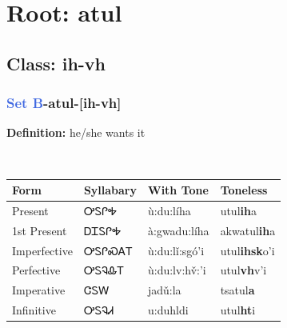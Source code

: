 \needspace{4in}
\section*{Root: atul}
\nopagebreak
{}
\needspace{3in}
\subsection*{Class: ih-vh}
\nopagebreak
\needspace{2in}
\subsubsection*{\textcolor{RoyalBlue}{Set B}{-}\textbf{atul}{-}[ih-vh]}
\nopagebreak
\textbf{Definition: } he/she wants it
\\[0.5em]
\begin{tabularx}{\textwidth}{l X X X}%
\toprule%
\textbf{Form}&\textbf{Syllabary}&\textbf{With Tone}&\textbf{Toneless}\\%
\midrule%
Present&ᎤᏚᎵᎭ&ù:du:líha&utul\textbf{ih}a\\%
1st Present&ᎠᏆᏚᎵᎭ&à:gwadu:líha&akwatul\textbf{ih}a\\%
Imperfective&ᎤᏚᎵᏍᎪᎢ&ù:du:lǐ:sgó’i&utul\textbf{ihsk}o'i\\%
Perfective&ᎤᏚᎸᎲᎢ&ù:du:lv:hv̌:’i&utul\textbf{vh}v'i\\%
Imperative&ᏣᏚᎳ&jadǔ:la&tsatul\textbf{a}\\%
Infinitive&ᎤᏚᎸᏗ&u:duhldi&utul\textbf{ht}i\\%
\bottomrule%
\end{tabularx}
\\[1em]